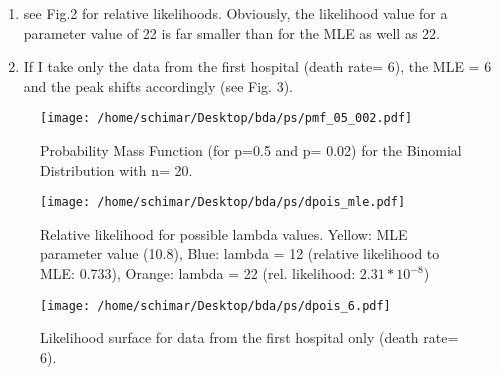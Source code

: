 \documentclass[letterpaper, 12pt]{article}
\begin{document}
\begin{enumerate}
\begin{enumerate}
		\item see Fig.2 for relative likelihoods. Obviously, the likelihood value for a parameter value of 22 is far smaller than for the MLE as well as 22.
		\item If I take only the data from the first hospital (death rate= 6), the MLE = 6 and the peak shifts accordingly (see Fig. 3). 

\end{enumerate}







\begin{figure}[H!]\centering
	\texttt{[image: /home/schimar/Desktop/bda/ps/pmf\_05\_002.pdf]}
	\caption{Probability Mass Function (for p=0.5 and p= 0.02) for the Binomial Distribution with n= 20.}
\end{figure}

\begin{figure}[H!]\centering
	\texttt{[image: /home/schimar/Desktop/bda/ps/dpois\_mle.pdf]}
	\caption{Relative likelihood for possible lambda values. Yellow: MLE parameter value (10.8), Blue: lambda = 12 (relative likelihood to MLE: 0.733), Orange: lambda = 22 (rel. likelihood: $2.31*10^{-8}$) }
\end{figure}

\begin{figure}[H!]\centering
	\texttt{[image: /home/schimar/Desktop/bda/ps/dpois\_6.pdf]}
	\caption{Likelihood surface for data from the first hospital only (death rate= 6). }
\end{figure}



\end{enumerate}
\end{document}
